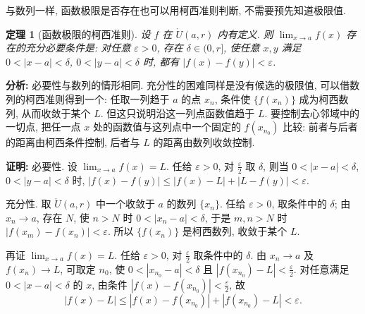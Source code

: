 \documentclass[UTF8,openany]{ctexbook}
\theoremstyle{chinesetextbook}
\newtheorem{theorem}{定理}[section]
\newenvironment{cnproof}{\par\indent\textbf{证明:} \ignorespaces}{\par}
\begin{document}
与数列一样, 函数极限是否存在也可以用柯西准则判断, 不需要预先知道极限值.
\begin{theorem}[函数极限的柯西准则]
设 $f$ 在 $\mathring U(a,r)$ 内有定义. 则 $\displaystyle\lim_{x\to a}f(x)$ 存在的充分必要条件是: 对任意 $\varepsilon>0$, 存在 $\delta\in(0,r]$, 使任意 $x,y$ 满足 $0<|x-a|<\delta$, $0<|y-a|<\delta$ 时, 都有 $|f(x)-f(y)|<\varepsilon$.
\end{theorem}
\par\indent\textbf{分析:} 必要性与数列的情形相同. 充分性的困难同样是没有候选的极限值, 可以借数列的柯西准则得到一个: 任取一列趋于 $a$ 的点 $x_n$, 条件使 $\{f(x_n)\}$ 成为柯西数列, 从而收敛于某个 $L$. 但这只说明沿这一列点函数值趋于 $L$. 要控制去心邻域中的一切点, 把任一点 $x$ 处的函数值与这列点中一个固定的 $f(x_{n_0})$ 比较: 前者与后者的距离由柯西条件控制, 后者与 $L$ 的距离由数列收敛控制.
\begin{cnproof}
必要性. 设 $\displaystyle\lim_{x\to a}f(x)=L$. 任给 $\varepsilon>0$, 对 $\displaystyle\frac\varepsilon2$ 取 $\delta$, 则当 $0<|x-a|<\delta$, $0<|y-a|<\delta$ 时, $|f(x)-f(y)|\le|f(x)-L|+|L-f(y)|<\varepsilon$.

充分性. 取 $\mathring U(a,r)$ 中一个收敛于 $a$ 的数列 $\{x_n\}$. 任给 $\varepsilon>0$, 取条件中的 $\delta$; 由 $x_n\to a$, 存在 $N$, 使 $n>N$ 时 $0<|x_n-a|<\delta$, 于是 $m,n>N$ 时 $|f(x_m)-f(x_n)|<\varepsilon$. 所以 $\{f(x_n)\}$ 是柯西数列, 收敛于某个 $L$.

再证 $\displaystyle\lim_{x\to a}f(x)=L$. 任给 $\varepsilon>0$, 对 $\displaystyle\frac\varepsilon2$ 取条件中的 $\delta$. 由 $x_n\to a$ 及 $f(x_n)\to L$, 可取定 $n_0$, 使 $0<|x_{n_0}-a|<\delta$ 且 $\displaystyle|f(x_{n_0})-L|<\frac\varepsilon2$. 对任意满足 $0<|x-a|<\delta$ 的 $x$, 由条件 $\displaystyle|f(x)-f(x_{n_0})|<\frac\varepsilon2$, 故
\[
|f(x)-L|\le|f(x)-f(x_{n_0})|+|f(x_{n_0})-L|<\varepsilon.
\]
\end{cnproof}
\end{document}
